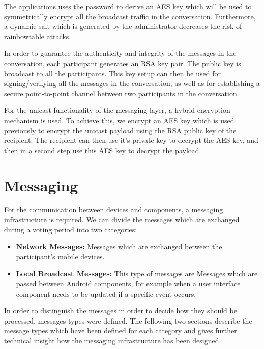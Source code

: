 \documentclass[numbers=noenddot, abstract=on, a4paper, headsepline,
footsepline, oneside, draft=off]{scrreprt}
\begin{document}
The applications uses the password to derive an AES key which will be used to
symmetrically encrypt all the broadcast traffic in the conversation.
Furthermore, a dynamic salt which is generated by the administrator decreases
the risk of rainbowtable attacks.

In order to guarantee the authenticity and integrity of the messages in the
conversation, each participant generates an RSA key pair. The public key is 
broadcast to all the participants. This key setup can then be used for
signing/verifying all the messages in the conversation, as well as for
establishing a secure point-to-point channel between two participants in the
conversation.

For the unicast functionality of the messaging layer, a hybrid encryption
mechanism is used. To achieve this, we encrypt an AES key which is used
previously to encrypt the unicast payload using the RSA public key of the
recipient. The recipient can then use it's private key to decrypt the AES key,
and then in a second step use this AES key to decrypt the payload.

\section{Messaging}
\label{sec:messaging}
For the communication between devices and components, a messaging infrastructure
is required. We can divide the messages which are exchanged during a voting
period into two categories:
\begin{itemize}
  \item \textbf{Network Messages:} Messages which are exchanged
  between the participant's mobile devices.
  \item \textbf{Local Broadcast Messages:} This type of messages are Messages
  which are passed between Android components, for example when a user interface
  component needs to be updated if a specific event occurs. 
\end{itemize}
In order to distinguish the messages in order to decide how they should be
processed, messages types were defined. The following two sections describe the
message types which have been defined for each category and gives further
technical insight how the messaging infrastructure has been designed.
\end{document}
